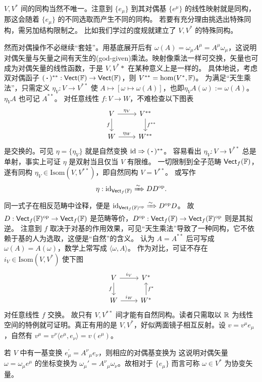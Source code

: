 $V,V^*$ 间的同构当然不唯一。注意到 $\{e_\mu\}$ 到其对偶基 $\{e^\mu\}$ 的线性映射就是同构，那这会随着 $\{e_\mu\}$ 的不同选取而产生不同的同构。
若要有充分理由挑选出特殊同构，需另加结构限制之。
比如我们学过的度规就建立了 $V,V^*$ 的特殊同构。

然而对偶操作不必继续“套娃”。用基底展开后有 $\omega(A)=\omega_\mu A^\mu=A^\mu\omega_\mu$，这说明对偶矢量与矢量之间有天生的(god-given)乘法。映射像乘法一样可交换，矢量也可成为对偶矢量的线性函数，于是 $V,V^**$ 在某种意义上是一样的。
具体地说，考虑双对偶函子 $(\oo)^{**}:\cate{Vect}(\F)\to\cate{Vect}(\F)$，则 $V^{**}=\hom(V^*,\mathbb{F})$。
为满足“天生乘法”，只需定义 $\eta_V:V\to V^{**}$ 使 $A\mapsto [\omega\mapsto\omega(A)]$，也即$\eta_V A(\omega):=\omega(A)$。$\eta_V A$ 也可记 $A^{**}$。
对任意线性 $f:V\to W$，不难检查以下图表
\[\begin{tikzcd}
    V \arrow[r, "\eta_V"] \ar[d, "f"'] & V^{**} \arrow[d, "f^{**}"] \\
    W \arrow[r, "\eta_W"] & W^{**}
\end{tikzcd}\]
是交换的。可见 $\eta=\{\eta_V\}$ 就是自然变换 $\id\Rightarrow (\oo)^{**}$。
容易看出 $\eta_V:V\to V^{**}$ 总是单射，事实上可证 $\eta$ 是双射当且仅当 $V$ 有限维。
一切限制到全子范畴 $\mathsf{Vect}_f(\mathbb{F})$，遂有同构 $\eta_V\in\mathrm{Isom}(V,V^{**})$，即自然同构 $V=V^{* *}$。
或写作
\[\eta: \mathrm{id}_{\mathsf{Vect}_f(\mathbb{F})} \xRightarrow{\sim} DD^\mathrm{op}.\]
同一式子在相反范畴中诠释，便是 $\mathrm{id}_{\mathsf{Vect}_f(\mathbb{F})^\mathrm{op}} \xRightarrow{\sim} D^\mathrm{op}D$。
故 $D: \mathsf{Vect}_f(\mathbb{F})^\text{op} \to \mathsf{Vect}_f(\mathbb{F})$ 是范畴等价，$D^\text{op}: \mathsf{Vect}_f(\mathbb{F}) \to \mathsf{Vect}_f(\mathbb{F})^\text{op}$ 则是其拟逆。
注意到 $f$ 取决于对基的作用效果，可见“天生乘法”导致了一种同构，它不依赖于基的人为选取，这便是“自然”的含义。
认为 $A=A^{**}$ 后可写成 $\omega(A)=A(\omega)$，数学上常写成 $\langle\omega,A\rangle$。
作为对比，可证不存在 $i_V\in\mathrm{Isom}(V,V^*)$ 使下图
\[\begin{tikzcd}
    V \arrow[r, "i_V"] \ar[d, "f"'] & V^{*} \\
    W \arrow[r, "i_W"] & W^{*} \arrow[u, "f^{*}"']
\end{tikzcd}\]
对任意线性 $f$ 交换。
故只有 $V,V^{* *}$ 间才能有自然同构。读者只需取以 $\mathbb{R}$ 为线性空间的特例就可证明。真正有用的是 $V,V^*$，好似两面镜子相互反射。设 $v=v^\mu e_\mu$，自然有 $v^\mu=v^\nu \langle e^\mu,e_\nu\rangle=v(e^\mu)$。

\begin{theorem}
    若 $V$ 中有一基变换 $e_\mu^{\prime}=A^\nu{ }_\mu e_\nu$，则相应的对偶基变换为
这说明对偶矢量 $\omega=\omega_\mu e^\mu$ 的坐标变换为 $\omega_\mu'=A^\nu{}_\mu\omega_\nu$。故相对于 $\{e_\mu\}$ 而言可称 $\omega\in V^*$ 为协变矢量。
\end{theorem}

